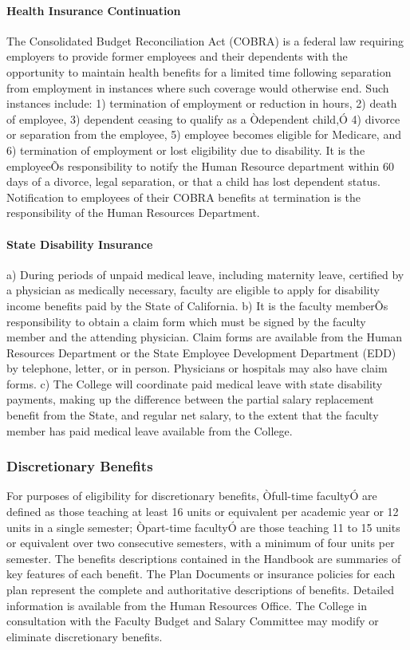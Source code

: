 \documentclass[letterpaper, 11pt]{article}
\begin{document}
			\paragraph{Health Insurance Continuation}
				The Consolidated Budget Reconciliation Act (COBRA) is a federal law requiring employers to provide former employees and their dependents with the opportunity to maintain health benefits for a limited time following separation from employment in instances where such coverage would otherwise end.  Such instances include:  1) termination of employment or reduction in hours, 2) death of employee, 3) dependent ceasing to qualify as a Òdependent child,Ó 4) divorce or separation from the employee, 5) employee becomes eligible for Medicare, and 6) termination of employment or lost eligibility due to disability.  It is the employeeÕs responsibility to notify the Human Resource department within 60 days of a divorce, legal separation, or that a child has lost dependent status.  Notification to employees of their COBRA benefits at termination is the responsibility of the Human Resources Department.
			\paragraph{State Disability Insurance}
				a) During periods of unpaid medical leave, including maternity leave, certified by a physician as medically necessary, faculty are eligible to apply for disability income benefits paid by the State of California.
				b) It is the faculty memberÕs responsibility to obtain a claim form which must be signed by the faculty member and the attending physician.  Claim forms are available from the Human Resources Department or the State Employee Development Department (EDD) by telephone, letter, or in person.  Physicians or hospitals may also have claim forms.
				c) The College will coordinate paid medical leave with state disability payments, making up the difference between the partial salary replacement benefit from the State, and regular net salary, to the extent that the faculty member has paid medical leave available from the College.
		\subsubsection{Discretionary Benefits}
			For purposes of eligibility for discretionary benefits, Òfull-time facultyÓ are defined as those teaching at least 16 units or equivalent per academic year or 12 units in a single semester; Òpart-time facultyÓ are those teaching 11 to 15 units or equivalent over two consecutive semesters, with a minimum of four units per semester.  The benefits descriptions contained in the Handbook are summaries of key features of each benefit.  The Plan Documents or insurance policies for each plan represent the complete and authoritative descriptions of benefits.  Detailed information is available from the Human Resources Office.  The College in consultation with the Faculty Budget and Salary Committee may modify or eliminate discretionary benefits.
\end{document}
